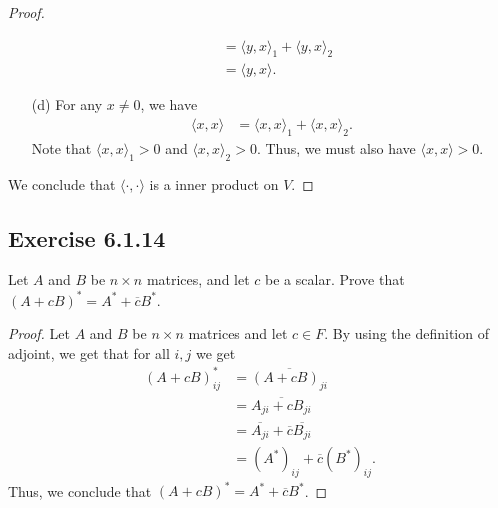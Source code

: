 \begin{proof}
\begin{enumerate}
\begin{align*}
                                                 &=  \langle y , x \rangle_{1} + \langle y , x \rangle_{2} \\
                                                 &= \langle y , x \rangle.
            \end{align*}
        \item[(d)] For any \( x \neq 0  \), we have
            \begin{align*}
                \langle x , x \rangle &= {\langle x , x \rangle}_{1} + {\langle x , x \rangle}_{2}. 
            \end{align*}
            Note that \( {\langle x , x \rangle}_{1} > 0  \) and \( \langle x , x \rangle_{2} > 0  \). Thus, we must also have \( \langle x  , x  \rangle > 0  \).
  \end{enumerate}
  We conclude that \( \langle \cdot  ,  \cdot  \rangle \) is a inner product on \( V  \).
\end{proof}

\subsection*{Exercise 6.1.14} Let \( A  \) and \( B  \) be \( n \times n  \) matrices, and let \( c  \) be a scalar. Prove that \( (A + cB)^{*} = A^{*} + \overline{c} B^{*} \).
\begin{proof}
Let \( A  \) and \( B  \) be \( n \times n  \) matrices and let \( c \in F  \). By using the definition of adjoint, we get that for all \( i,j \) we get
\begin{align*}
    (A + cB)_{ij}^{*} &= \overline{{(A + cB)}_{ji}}   \\
                        &=  \overline{{A}_{ji} + c {B}_{ji}} \\
                        &= \overline{{A}_{ji}} + \overline{c} \overline{{B}_{ji}} \\
                        &=  {(A^{*})}_{ij} + \overline{c} {(B^{*})}_{ij}.
\end{align*} 
Thus, we conclude that \( (A + cB)^{*} = A^{*} + \overline{c} B^{*} \).
\end{proof}

